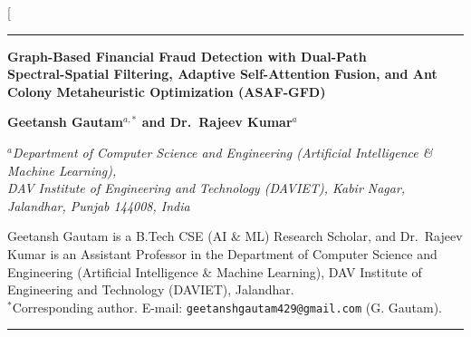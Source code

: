 \documentclass[10pt,a4paper,twocolumn]{article}
\begin{document}
\twocolumn[{%
  \begin{center}
    \vspace*{2pt}
    \noindent\rule{\textwidth}{1.2pt}
    \vspace{8pt}

    {\LARGE\bfseries\color{darkblue} Graph-Based Financial Fraud Detection with Dual-Path\\[3pt]
    Spectral-Spatial Filtering, Adaptive Self-Attention Fusion, and Ant\\[3pt]
    Colony Metaheuristic Optimization (ASAF-GFD)\par}

    \vspace{9pt}
    {\large\bfseries Geetansh Gautam$^{a,\ast}$ and Dr.\ Rajeev Kumar$^{a}$\par}
    \vspace{5pt}
    {\small\itshape $^{a}$Department of Computer Science and Engineering (Artificial Intelligence \& Machine Learning),\\
    DAV Institute of Engineering and Technology (DAVIET), Kabir Nagar, Jalandhar, Punjab 144008, India\par}
    \vspace{3pt}
    {\footnotesize Geetansh Gautam is a B.Tech CSE (AI \& ML) Research Scholar, and Dr.\ Rajeev Kumar is an Assistant Professor in the Department of Computer Science and Engineering (Artificial Intelligence \& Machine Learning), DAV Institute of Engineering and Technology (DAVIET), Jalandhar.\\[2pt]
    $^{\ast}$Corresponding author. E-mail: \texttt{geetanshgautam429@gmail.com} (G. Gautam).\par}
    \vspace{8pt}
    \noindent\rule{\textwidth}{0.6pt}
  \end{center}

}
\end{document}
